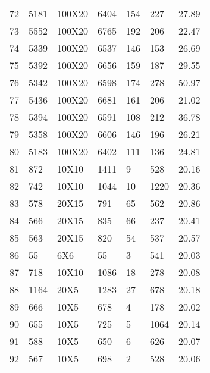 \documentclass[14pt]{acmsiggraph}
\begin{document}
\begin{table}[h!]
\begin{center}
{\begin{tabular}{||lllllll}
					72  & 5181 & 100X20 & \cellcolor[rgb]{0.7,0.79,0.38}6404  & 154 & 227  & 27.89 \\
					73  & 5552 & 100X20 & \cellcolor[rgb]{0.68,0.78,0.38}6765 & 192 & 206  & 22.47 \\
					74  & 5339 & 100X20 & \cellcolor[rgb]{0.69,0.78,0.38}6537 & 146 & 153  & 26.69 \\
					75  & 5392 & 100X20 & \cellcolor[rgb]{0.7,0.79,0.38}6656  & 159 & 187  & 29.55 \\
					76  & 5342 & 100X20 & \cellcolor[rgb]{0.7,0.79,0.38}6598  & 174 & 278  & 50.97 \\
					77  & 5436 & 100X20 & \cellcolor[rgb]{0.69,0.78,0.38}6681 & 161 & 206  & 21.02 \\
					78  & 5394 & 100X20 & \cellcolor[rgb]{0.68,0.78,0.38}6591 & 108 & 212  & 36.78 \\
					79  & 5358 & 100X20 & \cellcolor[rgb]{0.69,0.78,0.38}6606 & 146 & 196  & 26.21 \\
					80  & 5183 & 100X20 & \cellcolor[rgb]{0.7,0.79,0.38}6402  & 111 & 136  & 24.81 \\
					81  & 872  & 10X10  & \cellcolor[rgb]{1,0.7,0.39}1411     & 9   & 528  & 20.16 \\
					82  & 742  & 10X10  & \cellcolor[rgb]{0.89,0.87,0.47}1044 & 10  & 1220 & 20.36 \\
					83  & 578  & 20X15  & \cellcolor[rgb]{0.85,0.85,0.45}791  & 65  & 562  & 20.86 \\
					84  & 566  & 20X15  & \cellcolor[rgb]{0.96,0.9,0.5}835    & 66  & 237  & 20.41 \\
					85  & 563  & 20X15  & \cellcolor[rgb]{0.94,0.89,0.49}820  & 54  & 537  & 20.57 \\
					86  & 55   & 6X6    & \cellcolor[rgb]{0.43,0.67,0.27}55   & 3   & 541  & 20.03 \\
					87  & 718  & 10X10  & \cellcolor[rgb]{1,0.9,0.5}1086      & 18  & 278  & 20.08 \\
					88  & 1164 & 20X5   & \cellcolor[rgb]{0.55,0.72,0.32}1283 & 27  & 678  & 20.18 \\
					89  & 666  & 10X5   & \cellcolor[rgb]{0.45,0.68,0.28}678  & 4   & 178  & 20.02 \\
					90  & 655  & 10X5   & \cellcolor[rgb]{0.55,0.72,0.32}725  & 5   & 1064 & 20.14 \\
					91  & 588  & 10X5   & \cellcolor[rgb]{0.55,0.72,0.32}650  & 6   & 626  & 20.07 \\
					92  & 567  & 10X5   & \cellcolor[rgb]{0.69,0.78,0.38}698  & 2   & 528  & 20.06 \\

\end{tabular}}
\end{center}
\end{table}
\end{document}
